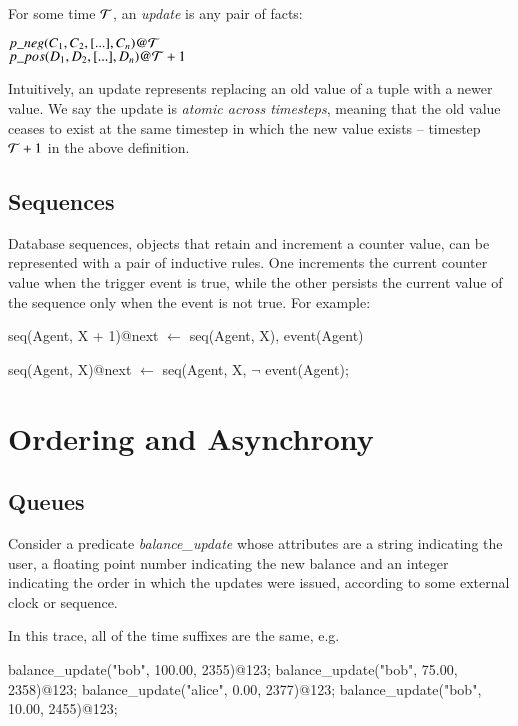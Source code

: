 %
For some time $\Tau$, an {\em update} is any pair of facts:

$p\_neg(C_{1},C_{2},[...],C_{n})@\Tau$ \\ $p\_pos(D_{1},D_{2},[...],D_{n})@\Tau+1$
%

Intuitively, an update represents replacing an old value of a tuple with a
newer value.  We say the update is {\em atomic across timesteps}, meaning that
the old value ceases to exist at the same timestep in which the new value
exists -- timestep $\Tau+1$ in the above definition.

\subsection{Sequences}

Database sequences, objects that retain and increment a counter value, can be
represented with a pair of inductive rules.  One increments the current counter value when the
trigger event is true, while the other persists the current value of the sequence only when the event is 
not true.  For example:

\begin{Dedalus}
seq(Agent, X + 1)@next \(\leftarrow\)
  seq(Agent, X), 
  event(Agent) 
  
seq(Agent, X)@next \(\leftarrow\) 
  seq(Agent, X, 
  \(\lnot\) event(Agent);
\end{Dedalus}



\section{Ordering and Asynchrony}


\subsection{Queues}

Consider a predicate \emph{balance\_update} whose attributes are a string indicating the user, a floating point number
indicating the new balance and an integer indicating the order in which the updates were issued, according to some 
external clock or sequence.  

In this trace, all of the time suffixes are the same, e.g.

\begin{Dedalus}
balance\_update("bob", 100.00, 2355)@123;
balance\_update("bob", 75.00, 2358)@123;
balance\_update("alice", 0.00, 2377)@123;
balance\_update("bob", 10.00, 2455)@123;
\end{Dedalus}

